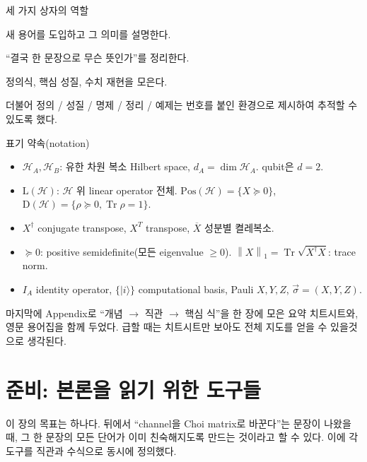 \documentclass[11pt,a4paper]{article}
\newcommand{\Hcal}{\mathcal{H}}
\newcommand{\Tr}{\operatorname{Tr}}
\newcommand{\Pos}{\mathrm{Pos}}
\newcommand{\Dens}{\mathrm{D}}
\newcommand{\Lin}{\mathrm{L}}
\newcommand{\onenorm}[1]{\left\lVert #1 \right\rVert_{1}}
\theoremstyle{definition}
\theoremstyle{plain}
\theoremstyle{remark}
\begin{document}
\begin{conceptbox}{세 가지 상자의 역할}
\begin{description}[leftmargin=1.4em,style=nextline]
  \item[\textcolor{blue!60!black}{$\blacksquare$} 개념 상자 (파랑)] 새 용어를 도입하고 그 의미를 설명한다.
  \item[\textcolor{green!50!black}{$\blacksquare$} 직관 요약 (초록)] ``결국 한 문장으로 무슨 뜻인가''를 정리한다.
  \item[\textcolor{orange!70!black}{$\blacksquare$} 수식 상자 (주황)] 정의식, 핵심 성질, 수치 재현을 모은다.
\end{description}
더불어 정의 / 성질 / 명제 / 정리 / 예제는 번호를 붙인 환경으로 제시하여 추적할 수 있도록 했다.
\end{conceptbox}

\begin{conceptbox}{표기 약속(notation)}
\begin{itemize}[leftmargin=1.4em]
  \item $\Hcal_A,\Hcal_B$: 유한 차원 복소 Hilbert space, $d_A=\dim\Hcal_A$. qubit은 $d=2$.
  \item $\Lin(\Hcal)$: $\Hcal$ 위 linear operator 전체. $\Pos(\Hcal)=\{X\succeq0\}$, $\Dens(\Hcal)=\{\rho\succeq0,\Tr\rho=1\}$.
  \item $X^\dagger$ conjugate transpose, $X^T$ transpose, $\overline{X}$ 성분별 켤레복소.
  \item $\succeq0$: positive semidefinite(모든 eigenvalue $\ge0$). $\onenorm{X}=\Tr\sqrt{X^\dagger X}$: trace norm.
  \item $I_A$ identity operator, $\{|i\rangle\}$ computational basis, Pauli $X,Y,Z$, $\vec\sigma=(X,Y,Z)$.
\end{itemize}
\end{conceptbox}

마지막에 Appendix로 ``개념 $\to$ 직관 $\to$ 핵심 식''을 한 장에 모은 요약 치트시트와, 영문 용어집을 함께 두었다. 급할 때는 치트시트만 보아도 전체 지도를 얻을 수 있을것으로 생각된다.

\section{준비: 본론을 읽기 위한 도구들}

이 장의 목표는 하나다. 뒤에서 ``channel을 Choi matrix로 바꾼다''는 문장이 나왔을 때, 그 한 문장의 모든 단어가 이미 친숙해지도록 만드는 것이라고 할 수 있다. 이에 각 도구를 직관과 수식으로 동시에 정의했다.
\end{document}
